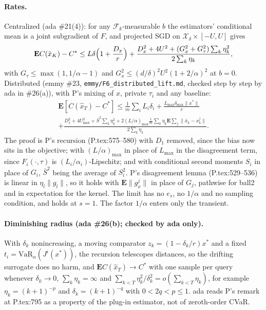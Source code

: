 \documentclass{article}
\newcommand{\E}{\mathbf{E}}
\begin{document}
\paragraph{Rates.} Centralized (ada \#21(4)): for any
$\mathcal F_k$-measurable $b$ the estimators' conditional mean is a joint
subgradient of $F$, and projected SGD on $\mathcal X_\delta\times[-U,U]$
gives
\begin{equation*}
\E C(\bar x_K)-C^*\le L\delta\Bigl(1+\frac{D_x}r\Bigr)
+\frac{D_x^2+4U^2+(G_x^2+G_\tau^2)\sum_k\eta_k^2}{2\sum_k\eta_k},
\end{equation*}
with $G_\tau\le\max(1,1/\alpha-1)$ and
$G_x^2\le(d/\delta)^2U^2(1+2/\alpha)^2$ at $b=0$. Distributed (emmy \#23,
\texttt{emmy/F6\_distributed\_lift.md}, checked step by step by ada in
\#26(a)), with P's mixing of $x$, private $\tau_i$ and any baseline:
\begin{multline*}
\E[C(\hat x_T)-C^*]\le\frac1m\sum_iL_i\delta_i
+\frac{L_{\max}\delta_{\max}\|x^*\|}r\\
+\frac{D_x^2+4U_{\max}^2+\bar S^2\sum_k\eta_k^2
+2(L/\alpha)_{\max}\frac1m\sum_k\eta_k\E\sum_j\|\bar x_k-x_k^j\|}
{2\sum_k\eta_k}.
\end{multline*}
The proof is P's recursion (P.tex:575--580) with $D_1$ removed, since the
bias now sits in the objective; with $(L/\alpha)_{\max}$ in place of
$L_{\max}$ in the disagreement term, since $F_i(\cdot,\tau)$ is
$(L_i/\alpha_i)$-Lipschitz; and with conditional second moments $S_i$ in
place of $G_i$, $\bar S^2$ being the average of $S_i^2$. P's disagreement
lemma (P.tex:529--536) is linear in $\eta_l\|g_l\|$, so it holds with
$\E\|g_x^j\|$ in place of $G_j$, pathwise for ball2 and in expectation for
the kernel. The limit has no $e_s$, no $1/\alpha$ and no sampling
condition, and holds at $s=1$. The factor $1/\alpha$ enters only the
transient.

\paragraph{Diminishing radius (ada \#26(b); checked by ada only).} With
$\delta_k$ nonincreasing, a moving comparator $z_k=(1-\delta_k/r)x^*$ and
a fixed $t_i=\mathrm{VaR}_\alpha(J^i(x^*))$, the recursion telescopes
distances, so the drifting surrogate does no harm, and
$\E C(\hat x_T)\to C^*$ with one sample per query whenever
$\delta_k\to0$, $\sum_k\eta_k=\infty$ and
$\sum_{k<T}\eta_k^2/\delta_k^2=o(\sum_{k<T}\eta_k)$, for example
$\eta_k=(k+1)^{-p}$ and $\delta_k=(k+1)^{-q}$ with $0<2q<p\le1$. ada
reads P's remark at P.tex:795 as a property of the plug-in estimator, not
of zeroth-order CVaR.
\end{document}
